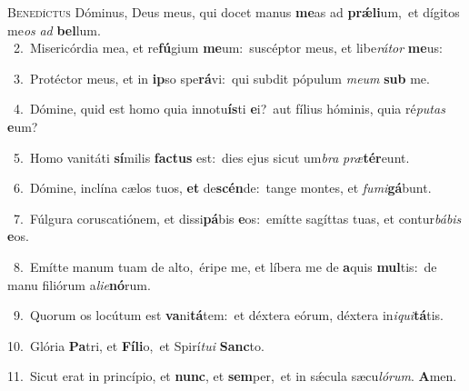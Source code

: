 \lettrine{\initial\textcolor{\initialcolor}{B}}{enedíctus} Dóminus, Deus meus, qui docet manus \textbf{me}\-as ad \textbf{prǽ}\-\textbf{li}um,~\star et dígitos me\textit{os} \textit{ad} \textbf{bel}\-lum.\\
{\numbfont\textcolor{\numbcolor}{~2.}}~Misericórdia mea, et re\-\textbf{fú}\-gium \textbf{me}\-um:~\star suscéptor meus, et libe\-\textit{rá}\-\textit{tor} \textbf{me}\-us:\par
{\numbfont\textcolor{\numbcolor}{~3.}}~Protéctor meus, et in \textbf{ip}\-so spe\-\textbf{rá}\-vi:~\star qui subdit pópulum \textit{me}\-\textit{um} \textbf{sub} me.\par
{\numbfont\textcolor{\numbcolor}{~4.}}~Dómine, quid est homo quia innotu\-\textbf{ís}\-ti \textbf{e}\-i?~\star aut fílius hóminis, quia ré\-\textit{pu}\-\textit{tas} \textbf{e}\-um?\par
{\numbfont\textcolor{\numbcolor}{~5.}}~Homo vanitáti \textbf{sí}\-milis \textbf{fac}\-\textbf{tus} est:~\star dies ejus sicut um\textit{bra} \textit{præ}\-\textbf{tér}eunt.\par
{\numbfont\textcolor{\numbcolor}{~6.}}~Dómine, inclína cælos tuos, \textbf{et} de\-\textbf{scén}\-de:~\star tange montes, et \textit{fu}\-\textit{mi}\textbf{gá}bunt.\par
{\numbfont\textcolor{\numbcolor}{~7.}}~Fúlgura coruscatiónem, et dissi\-\textbf{pá}\-bis \textbf{e}\-os:~\star emítte sagíttas tuas, et contur\-\textit{bá}\-\textit{bis} \textbf{e}\-os.\par
{\numbfont\textcolor{\numbcolor}{~8.}}~Emítte manum tuam de alto,~\dagger éripe me, et líbera me de \textbf{a}\-quis \textbf{mul}\-tis:~\star de manu filiórum a\-\textit{li}\-\textit{e}\textbf{nó}rum.\par
{\numbfont\textcolor{\numbcolor}{~9.}}~Quorum os locútum est \textbf{va}\-ni\-\textbf{tá}\-tem:~\star et déxtera eórum, déxtera in\-\textit{i}\-\textit{qui}\textbf{tá}tis.\par
{\numbfont\textcolor{\numbcolor}{10.}}~Glória \textbf{Pa}\-tri, et \textbf{Fí}\-\textbf{li}o,~\star et Spirí\-\textit{tu}\-\textit{i} \textbf{Sanc}\-to.\par
{\numbfont\textcolor{\numbcolor}{11.}}~Sicut erat in princípio, et \textbf{nunc}\-, et \textbf{sem}\-per,~\star et in sǽcula sæcu\-\textit{ló}\-\textit{rum}. \textbf{A}\-men.\par
